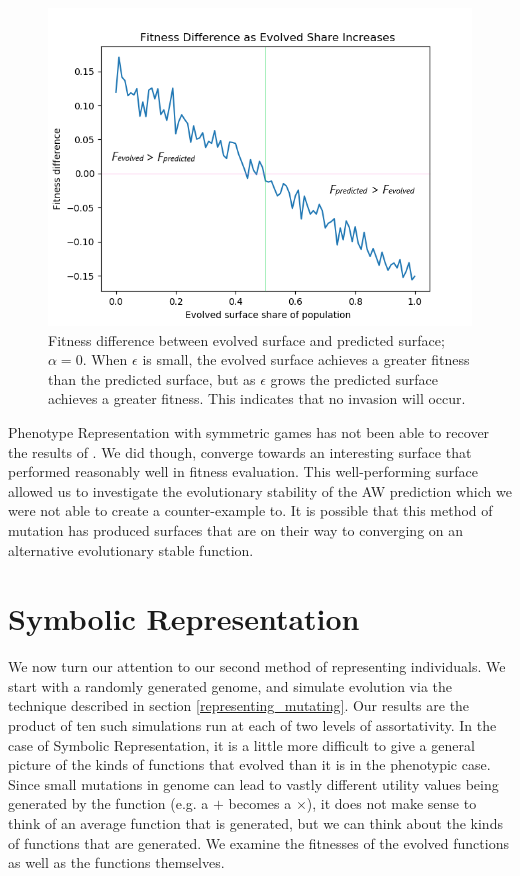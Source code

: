 \documentclass[11pt]{book}
\newcommand*{\np}{\par\noindent\newline}
\begin{document}
\begin{figure}
	\centering
	\includegraphics[scale=0.7]{resources/linegraph_fitness_difference_increasing_epsilon.png}
	\caption{Fitness difference between evolved surface and predicted surface; $\alpha = 0$.
	When $\epsilon$ is small, the evolved surface achieves a greater fitness than the predicted surface, but as $\epsilon$ grows the predicted surface achieves a greater fitness.
	This indicates that no invasion will occur.}
	\label{linegraph_fitness_difference_increasing_epsilon}
\end{figure}
\np Phenotype Representation with symmetric games has not been able to recover the results of \citet{alger_generalization_2012}.
We did though, converge towards an interesting surface that performed reasonably well in fitness evaluation.
This well-performing surface allowed us to investigate the evolutionary stability of the AW prediction which we were not able to create a counter-example to. 
It is possible that this method of mutation has produced surfaces that are on their way to converging on an alternative evolutionary stable function.


\section{Symbolic Representation}\label{symmetricGames_symb}

We now turn our attention to our second method of representing individuals.
We start with a randomly generated genome, and simulate evolution via the technique described in section \ref{representing_mutating}.
Our results are the product of ten such simulations run at each of two levels of assortativity.
In the case of Symbolic Representation, it is a little more difficult to give a general picture of the kinds of functions that evolved than it is in the phenotypic case.
Since small mutations in genome can lead to vastly different utility values being generated by the function (e.g. a $+$ becomes a $\times$), it does not make sense to think of an average function that is generated,
but we can think about the kinds of functions that are generated.
We examine the fitnesses of the evolved functions as well as the functions themselves.
\end{document}
